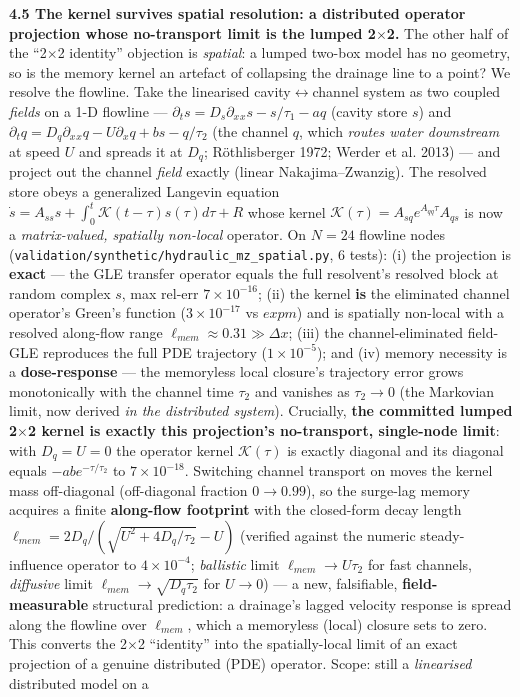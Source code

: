 \documentclass[tc, manuscript]{copernicus}
\begin{document}
\textbf{4.5 The kernel survives spatial resolution: a distributed operator projection whose no-transport limit is the lumped 2\ensuremath{\times}2.} The other half of the ``2\ensuremath{\times}2 identity'' objection is \emph{spatial}: a lumped two-box model has no geometry, so is the memory kernel an artefact of collapsing the drainage line to a point? We resolve the flowline. Take the linearised cavity\ensuremath{\leftrightarrow}channel system as two coupled \emph{fields} on a 1-D flowline — $\partial _{t}s = D_{s} \partial \ensuremath{{}_{x}}\ensuremath{{}_{x}}s - s/\tau _{1} - a q$ (cavity store $s$) and $\partial _{t}q = D_{q} \partial \ensuremath{{}_{x}}\ensuremath{{}_{x}}q - U \partial \ensuremath{{}_{x}}q + b s - q/\tau _{2}$ (the channel $q$, which \emph{routes water downstream} at speed $U$ and spreads it at $D_{q}$; Röthlisberger 1972; Werder et al. 2013) — and project out the channel \emph{field} exactly (linear Nakajima–Zwanzig). The resolved store obeys a generalized Langevin equation $\dot{s} = A_{ss} s + \int _{0}^{t} \ensuremath{\mathcal{K}}(t-\tau ) s(\tau ) d\tau  + R$ whose kernel $\ensuremath{\mathcal{K}}(\tau ) = A_{sq} e^{A_{qq} \tau } A_{qs}$ is now a \emph{matrix-valued, spatially non-local} operator. On $N=24$ flowline nodes (\texttt{validation/\allowbreak{}synthetic/\allowbreak{}hydraulic\_\allowbreak{}mz\_\allowbreak{}spatial.\allowbreak{}py}, 6 tests): (i) the projection is \textbf{exact} — the GLE transfer operator equals the full resolvent's resolved block at random complex $s$, max rel-err $7\times 10^{-16}$; (ii) the kernel \textbf{is} the eliminated channel operator's Green's function ($3\times 10^{-17}$ vs $expm$) and is spatially non-local with a resolved along-flow range $\ell _{mem}\approx 0.31 \gg  \Delta x$; (iii) the channel-eliminated field-GLE reproduces the full PDE trajectory ($1\times 10^{-5}$); and (iv) memory necessity is a \textbf{dose-response} — the memoryless local closure's trajectory error grows monotonically with the channel time $\tau _{2}$ and vanishes as $\tau _{2}\to 0$ (the Markovian limit, now derived \emph{in the distributed system}). Crucially, \textbf{the committed lumped 2\ensuremath{\times}2 kernel is exactly this projection's no-transport, single-node limit}: with $D_{q}=U=0$ the operator kernel $\ensuremath{\mathcal{K}}(\tau )$ is exactly diagonal and its diagonal equals $-ab e^{-\tau /\tau _{2}}$ to $7\times 10^{-18}$. Switching channel transport on moves the kernel mass off-diagonal (off-diagonal fraction $0\to 0.99$), so the surge-lag memory acquires a finite \textbf{along-flow footprint} with the closed-form decay length $\ell _{mem} = 2D_{q}/(\sqrt{U^{2}+4D_{q}/\tau _{2}}-U)$ (verified against the numeric steady-influence operator to $4\times 10^{-4}$; \emph{ballistic} limit $\ell _{mem}\to U\tau _{2}$ for fast channels, \emph{diffusive} limit $\ell _{mem}\to \sqrt{D_{q}\tau _{2}}$ for $U\to 0$) — a new, falsifiable, \textbf{field-measurable} structural prediction: a drainage's lagged velocity response is spread along the flowline over $\ell _{mem}$, which a memoryless (local) closure sets to zero. This converts the 2\ensuremath{\times}2 ``identity'' into the spatially-local limit of an exact projection of a genuine distributed (PDE) operator. Scope: still a \emph{linearised} distributed model on a 
\end{document}
